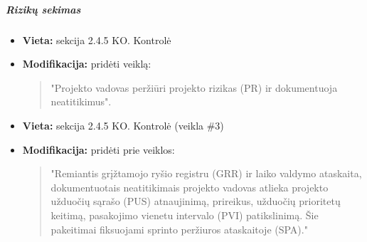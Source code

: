 \documentclass{article}
\begin{document}
\subparagraph{Rizikų sekimas}
\begin{itemize}
    \item \textbf{Vieta:} sekcija 2.4.5 KO. Kontrolė
    \item \textbf{Modifikacija:} pridėti veiklą:
    \begin{quote}
        "Projekto vadovas peržiūri projekto rizikas (PR) ir dokumentuoja neatitikimus".
    \end{quote}
\end{itemize}

\begin{itemize}
    \item \textbf{Vieta:} sekcija 2.4.5 KO. Kontrolė (veikla \#3)
    \item \textbf{Modifikacija:} pridėti prie veiklos:
    \begin{quote}
        "Remiantis grįžtamojo ryšio registru (GRR) ir laiko valdymo ataskaita, dokumentuotais neatitikimais projekto vadovas atlieka projekto užduočių sąrašo (PUS) atnaujinimą, prireikus, užduočių prioritetų keitimą, pasakojimo vienetu intervalo (PVI) patikslinimą. Šie pakeitimai fiksuojami sprinto peržiuros ataskaitoje (SPA)."
    \end{quote}
\end{itemize}
\end{document}
